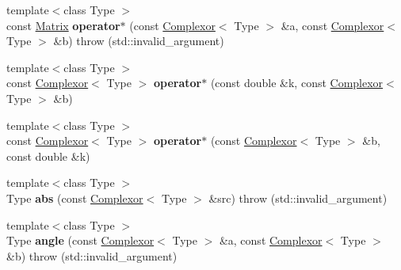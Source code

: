 \begin{DoxyCompactItemize}
\item 
\mbox{\label{namespacekerbal_1_1math_a848a4ed1bd4cfdff5a838eed213c7cb8}} 
{\footnotesize template$<$class Type $>$ }\\const \hyperlink{classkerbal_1_1math_1_1_matrix}{Matrix} {\bfseries operator$\ast$} (const \hyperlink{classkerbal_1_1math_1_1_complexor}{Complexor}$<$ Type $>$ \&a, const \hyperlink{classkerbal_1_1math_1_1_complexor}{Complexor}$<$ Type $>$ \&b)  throw (std\+::invalid\+\_\+argument)
\item 
\mbox{\label{namespacekerbal_1_1math_a5b0aaee1ff1d1950a71c2d8ab54e8079}} 
{\footnotesize template$<$class Type $>$ }\\const \hyperlink{classkerbal_1_1math_1_1_complexor}{Complexor}$<$ Type $>$ {\bfseries operator$\ast$} (const double \&k, const \hyperlink{classkerbal_1_1math_1_1_complexor}{Complexor}$<$ Type $>$ \&b)
\item 
\mbox{\label{namespacekerbal_1_1math_ad58b45135c38c1fe8041159e726a8c8d}} 
{\footnotesize template$<$class Type $>$ }\\const \hyperlink{classkerbal_1_1math_1_1_complexor}{Complexor}$<$ Type $>$ {\bfseries operator$\ast$} (const \hyperlink{classkerbal_1_1math_1_1_complexor}{Complexor}$<$ Type $>$ \&b, const double \&k)
\item 
\mbox{\label{namespacekerbal_1_1math_aedfe3b7c86a17803ff4159cca41dc370}} 
{\footnotesize template$<$class Type $>$ }\\Type {\bfseries abs} (const \hyperlink{classkerbal_1_1math_1_1_complexor}{Complexor}$<$ Type $>$ \&src)  throw (std\+::invalid\+\_\+argument)
\item 
\mbox{\label{namespacekerbal_1_1math_ad8f235d76af018b00d2c7808b139b942}} 
{\footnotesize template$<$class Type $>$ }\\Type {\bfseries angle} (const \hyperlink{classkerbal_1_1math_1_1_complexor}{Complexor}$<$ Type $>$ \&a, const \hyperlink{classkerbal_1_1math_1_1_complexor}{Complexor}$<$ Type $>$ \&b)  throw (std\+::invalid\+\_\+argument)
\item 
\mbox{\label{namespacekerbal_1_1math_a83193c8ac64f05738e7962ba6901f86a}} 

\end{DoxyCompactItemize}
